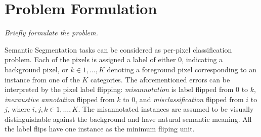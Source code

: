 \section{Problem Formulation}
\label{sec:formulation}

\noindent
\textit{Briefly formulate the problem.}

\noindent
Semantic Segmentation tasks can be considered as per-pixel classification problem. Each of the pixels is assigned a label of either $0$, indicating a background pixel, or $k \in {1, \ldots, K}$ denoting a foreground pixel corresponding to an instance from one of the $K$ categories.
The aforementioned errors can be interpreted by the pixel label flipping:
\textit{misannotation} is label flipped from $0$ to $k$, \textit{inexaustive annotation} flipped from $k$ to $0$, and \textit{misclassification} flipped from $i$ to $j$, where $i, j, k \in {1, \ldots, K}$.
The misannotated instances are assumed to be visually distinguishable against the background and have natural semantic meaning. All the label flips have one instance as the minimum fliping unit.

